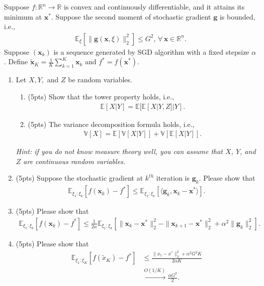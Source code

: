 \documentclass[11pt,letter,notitlepage]{article}
\begin{document}
\begin{exercise}
	Suppose $f:\mathbb{R}^n \rightarrow \mathbb{R}$ is convex and continuously differentiable, and it attains its minimum at $\mathbf{x}^*$. Suppose the second moment of stochastic gradient $ \mathbf{g} $ is bounded, i.e.,
	\begin{align*}
	\mathbb{E}_{\xi}[\|\mathbf{g}(\mathbf{x},\xi)\|_2^2]\leq G^2,\,\forall\,\mathbf{x}\in \mathbb{R}^n.
	\end{align*}
	Suppose $(\mathbf{x}_k)$ is a sequence generated by SGD algorithm with a fixed stepsize $\alpha$. Define 
	$ \mathbf{\tilde{x}}_K=\frac{1}{K}\sum_{k=1}^{K} \mathbf{x}_k $ and $ f^*=f(\mathbf{x}^*) $. 
    
	
	\begin{enumerate}
	    \item Let $X, Y,$ and $Z$ be random variables.
	    \begin{enumerate}
	        \item (5pts) Show that the tower property holds, i.e.,
        	\begin{align*}
        	    \mathbb{E}[X|Y] = \mathbb{E}[\mathbb{E}[X|Y,Z] |Y].
        	\end{align*}
        	\item (5pts) The variance decomposition formula holds, i.e.,
        	\begin{align*}
        	    \mathbb{V}[X] = \mathbb{E}[\mathbb{V}[X|Y]]+\mathbb{V}[\mathbb{E}[X|Y]].
        	\end{align*}
	    \end{enumerate}
    	\emph{Hint: if you do not know measure theory well, you can assume that $X$, $Y$, and $Z$ are continuous random variables.}
		\item (5pts) Suppose the stochastic gradient at $ k^{th} $ iteration is $ \mathbf{g}_k $.  Please show that
		\begin{align*}
		\mathbb{E}_{\xi_1:\xi_k}[f(\mathbf{x}_k)-f^*]\leq\mathbb{E}_{\xi_1:\xi_k}[\langle{\mathbf{g}_k, \mathbf{x}_k-\mathbf{x}^*}\rangle].
		\end{align*}
		\item (5pts) Please show that
		\begin{align}
		\mathbb{E}_{\xi_1:\xi_k}[f(\mathbf{x}_k)-f^*]\leq\frac{1}{2\alpha}\mathbb{E}_{\xi_1:\xi_k}[\|\mathbf{x}_k-\mathbf{x}^*\|_2^2 - \|\mathbf{x}_{k+1}-\mathbf{x}^*\|_2^2 + \alpha^2 \|\mathbf{g}_k\|_2^2].
		\end{align}
		\item (5pts) Please show that
		\begin{align*}
		\mathbb{E}_{\xi_1:\xi_K}[f(\tilde{x}_K)-f^*] &\leq \frac{\|x_1-x^*\|_2^2 + \alpha^2 G^2 K}{2\alpha K}\\
		&\xrightarrow[]{O(1/K)}\frac{\alpha G^2}{2}.
		\end{align*}
	\end{enumerate}
\end{exercise}
\begin{solution}

\end{solution}
\newpage
\end{document}
